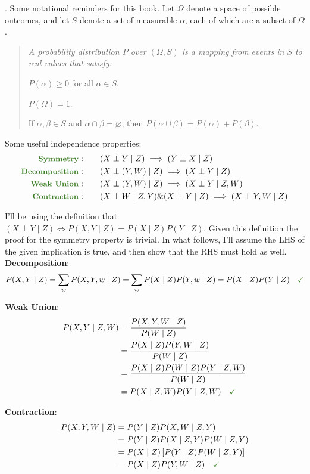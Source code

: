 \documentclass[11pt]{article}
\begin{document}
\myspace
\p {}. Some notational reminders for this book. Let $\Omega$ denote a space of possible outcomes, and let $S$ denote a set of measurable  $\alpha$, each of which are a subset of $\Omega$.
\vspace{-0.5em}
\begin{quote}
	{\footnotesize\itshape 
		A probability distribution $P$ over $(\Omega, S)$ is a mapping from events in $S$ to real values that satisfy:
		\begin{compactitem}
			\item $P(\alpha) \ge 0$ for all $\alpha \in S$. 
			\item $P(\Omega) = 1$.
			\item If $\alpha, \beta \in S$ and $\alpha \cap \beta = \varnothing$, then $P(\alpha \cup \beta) = P(\alpha) + P(\beta)$.
		\end{compactitem}	
	}
\end{quote}
Some useful independence properties:
\begin{align}
	 \mtgreen{Symmetry}:\qquad			&(X \perp Y \mid Z) \implies (Y \perp X \mid Z) \\
	 \mtgreen{Decomposition}:\qquad	&(X \perp (Y, W) \mid Z) \implies (X \perp Y \mid Z)  \\
	 \mtgreen{Weak Union}:\qquad 		&(X \perp (Y, W) \mid Z) \implies (X \perp Y \mid Z, W) \\
	 \mtgreen{Contraction}:\qquad 	&(X \perp W \mid Z, Y) \& (X \perp Y \mid Z) \implies (X \perp Y, W \mid Z)
\end{align}
\begin{example}
I'll be using the definition that $(X \perp Y \mid Z) \Leftrightarrow P(X, Y \mid Z)=P(X \mid Z)P(Y \mid Z)$. Given this definition the proof for the symmetry property is trivial. In what follows, I'll assume the LHS of the given implication is true, and then show that the RHS must hold as well. \\

\textbf{Decomposition}:
$$P(X, Y \mid Z) = \sum_w P(X, Y, w \mid Z) = \sum_w P(X \mid Z) P(Y, w \mid Z)  = P(X \mid Z) P(Y \mid Z) \quad \mgreen{\checkmark}$$

\textbf{Weak Union}: 
\begin{align}
	P(X, Y \mid Z, W) &= \frac{ P(X, Y, W \mid Z) }{ P(W \mid Z) } \\
	&= \frac{ P(X \mid Z) P(Y, W \mid Z) }{ P(W \mid Z) } \\
	&= \frac{  P(X \mid Z) P(W \mid Z) P(Y \mid Z, W) }{ P(W \mid Z) } \\
	&= P(X \mid Z, W) P(Y \mid Z, W) \quad \mgreen{\checkmark}
\end{align}

\p \textbf{Contraction}: 
\begin{align}
	P(X, Y, W \mid Z) 
	&= P(Y \mid Z) P(X, W \mid Z, Y)	\\
	&= P(Y \mid Z) P(X \mid Z, Y) P(W \mid Z, Y) \\
	&= P(X \mid Z) \left[  P(Y \mid Z) P(W \mid Z, Y) \right] \\
	&= P(X \mid Z) P(Y, W \mid Z) \quad \mgreen{\checkmark}
\end{align}
\end{example}
\end{document}
